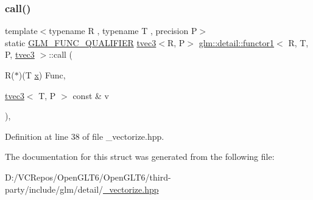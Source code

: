 \subsubsection{\texorpdfstring{call()}{call()}}
{\footnotesize\ttfamily template$<$typename R , typename T , precision P$>$ \\
static \mbox{\hyperlink{setup_8hpp_a33fdea6f91c5f834105f7415e2a64407}{G\+L\+M\+\_\+\+F\+U\+N\+C\+\_\+\+Q\+U\+A\+L\+I\+F\+I\+ER}} \mbox{\hyperlink{structglm_1_1tvec3}{tvec3}}$<$R, P$>$ \mbox{\hyperlink{structglm_1_1detail_1_1functor1}{glm\+::detail\+::functor1}}$<$ R, T, P, \mbox{\hyperlink{structglm_1_1tvec3}{tvec3}} $>$\+::call (\begin{DoxyParamCaption}\item[{R($\ast$)(T \mbox{\hyperlink{glad_8h_a92d0386e5c19fb81ea88c9f99644ab1d}{x}})}]{Func,  }\item[{\mbox{\hyperlink{structglm_1_1tvec3}{tvec3}}$<$ T, P $>$ const \&}]{v }\end{DoxyParamCaption})\hspace{0.3cm}{\ttfamily [inline]}, {\ttfamily [static]}}



Definition at line 38 of file \+\_\+vectorize.\+hpp.



The documentation for this struct was generated from the following file\+:\begin{DoxyCompactItemize}
\item 
D\+:/\+V\+C\+Repos/\+Open\+G\+L\+T6/\+Open\+G\+L\+T6/third-\/party/include/glm/detail/\mbox{\hyperlink{__vectorize_8hpp}{\+\_\+vectorize.\+hpp}}\end{DoxyCompactItemize}

